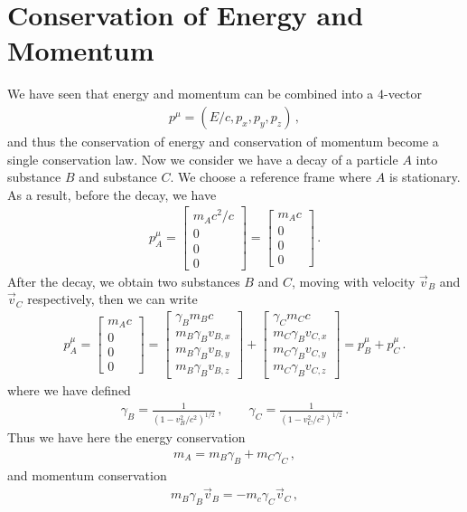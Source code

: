 \documentclass[11pt, onesided]{book}
\theoremstyle{break}
\theoremstyle{break}
\newcommand{\bmat}[1]{\begin{bmatrix} #1 \end{bmatrix}}
\begin{document}
\newpage


\newpage
\section[Conservation of Energy and Momentum]{\color{red} Conservation of Energy and Momentum\color{black}}
We have seen that energy and momentum can be combined into a $4$-vector
\begin{align*}
p^\mu = (E/c, p_x, p_y, p_z)\,,
\end{align*}
and thus the conservation of energy and conservation of momentum become a single conservation law. Now we consider we have a decay of a particle $A$ into substance $B$ and substance $C$. We choose a reference frame where $A$ is stationary. As a result, before the decay, we have
\begin{align*}
p_A^\mu = \bmat{m_Ac^2/c \\ 0 \\ 0 \\ 0} = \bmat{m_Ac \\ 0 \\ 0 \\ 0}\,.
\end{align*}
After the decay, we obtain two substances $B$ and $C$, moving with velocity $\vec{v}_B$ and $\vec{v}_C$ respectively, then we can write
\begin{align*}
p_A^\mu = \bmat{m_Ac \\ 0 \\ 0 \\ 0} = 
\bmat{\gamma_B m_Bc \\ m_B \gamma_B v_{B,x} \\ m_B \gamma_B v_{B,y} \\ m_B \gamma_B v_{B,z}}+
\bmat{\gamma_C m_Cc \\ m_C \gamma_B v_{C,x} \\ m_C \gamma_B v_{C,y} \\ m_C \gamma_B v_{C,z}} = p_B^\mu + p_C^\mu\,.
\end{align*}
where we have defined
\begin{align*}
\gamma_B = \frac{1}{(1- v_B^2/c^2)^{1/2}}\,,\qquad
\gamma_C = \frac{1}{(1- v_C^2/c^2)^{1/2}}\,.
\end{align*}
Thus we have here the energy conservation
\begin{align}
m_A = m_B \gamma_B + m_C\gamma_C\,,
\end{align}
and momentum conservation
\begin{align*}
m_B \gamma_B \vec{v}_B =- m_c \gamma_C \vec{v}_C\,,
\end{align*}
\end{document}
